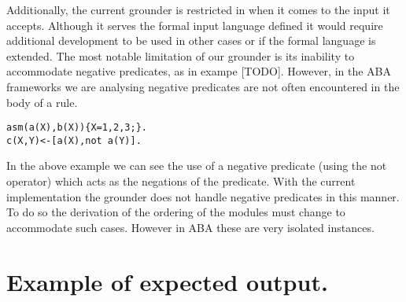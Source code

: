 Additionally, the current grounder is restricted in when it comes to the input it accepts. Although it serves the formal input language defined it would require additional development to be used in other cases or if the formal language is extended. The most notable limitation of our grounder is its inability to accommodate negative predicates, as in exampe [TODO]. However, in the ABA frameworks we are analysing negative predicates are not often encountered in the body of a rule.

\begin{Verbatim}[frame=single]
asm(a(X),b(X)){X=1,2,3;}.
c(X,Y)<-[a(X),not a(Y)].
\end{Verbatim}

In the above example we can see the use of a negative predicate (using the not operator) which acts as the negations of the predicate. With the current implementation the grounder does not handle negative predicates in this manner. To do so the derivation of the ordering of the modules must change to accommodate such cases. However in ABA these are very isolated instances.
\section{Example of expected output.}